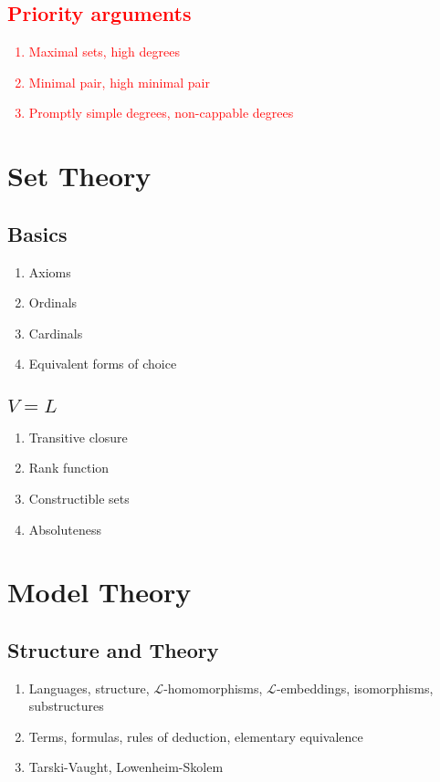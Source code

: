 \documentclass{article}
\newcommand{\MAYBE}[1]{\textcolor{red}{#1}}
\begin{document}
\MAYBE{
\subsection{Priority arguments} 
\begin{enumerate}
  \item Maximal sets, high degrees
  \item Minimal pair, high minimal pair
  \item Promptly simple degrees, non-cappable degrees
\end{enumerate}
}

\section{Set Theory}
\subsection{Basics} 
\begin{enumerate}
  \item Axioms
  \item Ordinals
  \item Cardinals
  \item Equivalent forms of choice
\end{enumerate}

\subsection{$V=L$} 
\begin{enumerate}
  \item Transitive closure
  \item Rank function
  \item Constructible sets
  \item Absoluteness
\end{enumerate}

\section{Model Theory}
\subsection{Structure and Theory} 
\begin{enumerate}
  \item Languages, structure, $\mathcal{L}$-homomorphisms,
    $\mathcal{L}$-embeddings, isomorphisms, substructures
  \item Terms, formulas, rules of deduction, elementary equivalence
  \item Tarski-Vaught, Lowenheim-Skolem
\end{enumerate}
\end{document}
